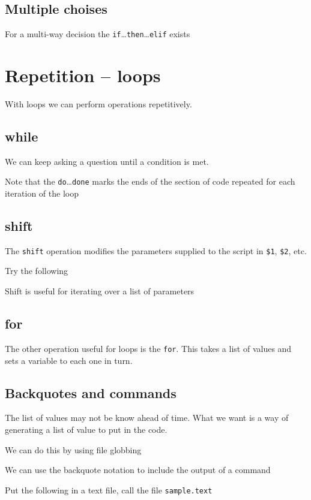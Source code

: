 \documentclass[12pt,a4paper]{article}
\begin{document}
\subsection{Multiple choises}
For a multi-way decision the
\texttt{if}\ldots\texttt{then}\ldots\texttt{elif} exists



\section{Repetition -- loops}
With loops we can perform operations repetitively.

\subsection{while}
We can keep asking a question until a condition is met.

Note that the \texttt{do}\ldots\texttt{done} marks the ends of the
section of code repeated for each iteration of the loop

\subsection{shift}
The \texttt{shift} operation modifies the parameters supplied to the
script in \texttt{\$1}, \texttt{\$2}, etc.

Try the following

Shift is useful for iterating over a list of parameters


\subsection{for}
The other operation useful for loops is the \texttt{for}.
This takes a list of values and sets a variable to each one in turn.


\subsection{Backquotes and commands}
The list of values may not be know ahead of time.  What we want is a
way of generating a list of value to put in the code.

We can do this by using file globbing


We can use the backquote notation to include the output of a command

Put the following in a text file, call the file \texttt{sample.text}

\end{document}
